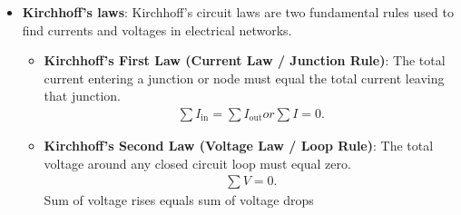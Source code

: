 \documentclass{report}
\begin{document}
\begin{itemize}
        \item \textbf{Kirchhoff's laws}: Kirchhoff's circuit laws are two fundamental rules used to find currents and voltages in electrical networks.
            \begin{itemize}
                \item \textbf{Kirchhoff's First Law (Current Law / Junction Rule)}: The total current entering a junction or node must equal the total current leaving that junction.
                    \begin{align*}
                         \sum I_{\text{in}} = \sum I_{\text{out}} or \sum I = 0
                    .\end{align*}
                \item \textbf{Kirchhoff's Second Law (Voltage Law / Loop Rule)}: The total voltage around any closed circuit loop must equal zero.
                    \begin{align*}
                        \sum V = 0 
                    .\end{align*}
                    Sum of voltage rises equals sum of voltage drops


\end{itemize}
\end{itemize}
\end{document}
